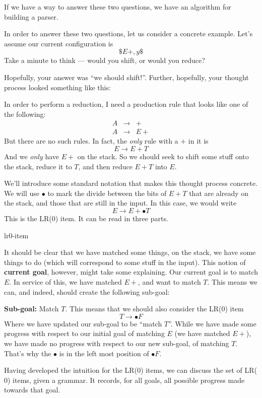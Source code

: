 If we have a way to answer these two questions, we have an algorithm for building a parser. 

In order to answer these two questions, let us consider a concrete example. Let's assume our current configuration is
\[\$E+, y\$\]
Take a minute to think --- would you shift, or would you reduce?

Hopefully, your answer was ``we should shift!''. Further, hopefully, your thought process looked something like this:

In order to perform a reduction, I need a production rule that looks like one of the following:
\[\begin{array}{lcl}
     A & \to & +  \\
     A & \to & E+
\end{array}\]
But there are no such rules. In fact, the \textit{only} rule with a $+$ in it is
\[E \to E + T\]
And we \textit{only} have $E+$ on the stack. So we should seek to shift some stuff onto the stack, reduce it to $T$, and then reduce $E+T$ into $E$.

We'll introduce some standard notation that makes this thought process concrete. We will use $\bullet$ to mark the divide between the bits of $E + T$ that are already on the stack, and those that are still in the input. In this case, we would write
\[E \rightarrow E+ \bullet T\]
This is the LR($0$) item. It can be read in three parts.
\begin{center}
    {lr0-item}
\end{center}

It should be clear that we have matched some things, on the stack, we have some things to do (which will correspond to some stuff in the input). This notion of \textbf{current goal}, however, might take some explaining. Our current goal is to match $E$. In service of this, we have matched $E+$, and want to match $T$. This means we can, and indeed, should create the following sub-goal:

\textbf{Sub-goal:} Match $T$. This means that we should also consider the LR($0$) item
\[T \to \bullet F\]
Where we have updated our sub-goal to be ``match $T$''. While we have made some progress with respect to our initial goal of matching $E$ (we have matched $E+$), we have made no progress with respect to our new sub-goal, of matching $T$. That's why the $\bullet$ is in the left most position of $\bullet F$.

Having developed the intuition for the LR($0$) items, we can discuss the set of LR($0$) items, given a grammar. It records, for all goals, all possible progress made towards that goal.

